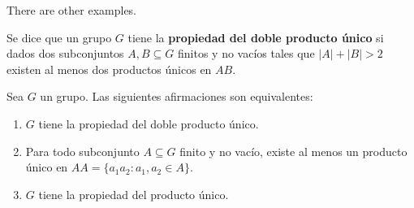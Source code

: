 There are other examples. 



\begin{definition}
	Se dice que un grupo $G$ tiene la \textbf{propiedad del doble producto
	único} si dados dos subconjuntos $A,B\subseteq G$ finitos y no vacíos tales
	que $|A|+|B|>2$ existen al menos dos productos únicos en $AB$.
\end{definition}

\begin{theorem}[Strojnowski]
	\label{theorem:Strojnowski}
	Sea $G$ un grupo. Las siguientes afirmaciones son equivalentes:
	\begin{enumerate}
		\item $G$ tiene la propiedad del doble producto único.
		\item Para todo subconjunto $A\subseteq G$ finito y no vacío, existe al
			menos un producto único en $AA=\{a_1a_2:a_1,a_2\in A\}$.
		\item $G$ tiene la propiedad del producto único.
	\end{enumerate}
\end{theorem}

